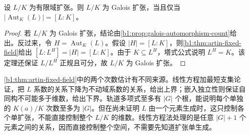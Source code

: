 \begin{corollary}\label{b1:cor:galois-automorphism-criterion}
	设 \(L/K\) 为有限域扩张。则 \(L/K\) 为 Galois 扩张，当且仅当 \(|\operatorname{Aut}_K(L)|=[L:K]\)。
\end{corollary}
\begin{proof}
	若 \(L/K\) 为 Galois 扩张，结论由\cref{b1:prop:galois-automorphism-count}给出。反过来，令 \(H=\operatorname{Aut}_K(L)\)。假设 \(|H|=[L:K]\)，则\cref{b1:thm:artin-fixed-field}给出 \([L:L^H]=|H|=[L:K]\)。由于 \(K\subseteq L^H\)，塔式公式说明 \(L^H=K\)。该定理还保证 \(L/L^H\) 正规且可分，故 \(L/K\) 为 Galois 扩张。
\end{proof}

\cref{b1:thm:artin-fixed-field}中的两个次数估计有不同来源。线性方程加最短支集论证，把 \(L\) 系数的关系下降为不动域系数的关系，给出上界；嵌入独立性则保证自同构不可能多于维数，给出下界。轨道多项式至多有 \(|G|\) 个根，能说明每个单独的 \(K(a)/K\) 次数至多为 \(|G|\)。但在尚未证明 \(L\) 由一个元素生成时，这只控制各个单扩张，不能直接控制整个 \(L/K\) 的维数。线性方程法处理的是任意 \(|G|+1\) 个元素之间的关系，因而直接控制整个空间，不需要先知道扩张单生成。
